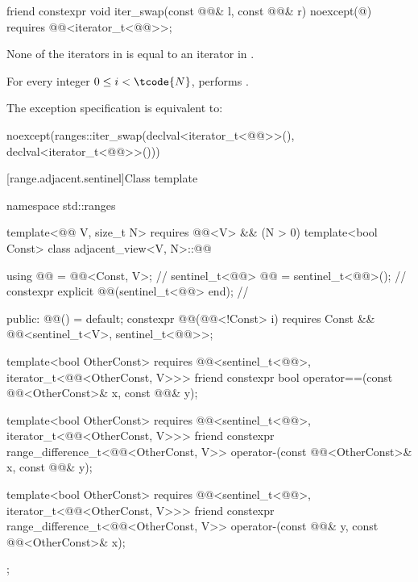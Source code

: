 %
\begin{itemdecl}
friend constexpr void iter_swap(const @@& l, const @@& r) noexcept(@\seebelow@)
  requires @@<iterator_t<@@>>;
\end{itemdecl}

\begin{itemdescr}
\pnum
\expects
None of the iterators in  is equal to
an iterator in .

\pnum
\effects
For every integer $0 \leq i < \tcode{N}$,
performs
.

\pnum
\remarks
The exception specification is equivalent to:
\begin{codeblock}
noexcept(ranges::iter_swap(declval<iterator_t<@@>>(), declval<iterator_t<@@>>()))
\end{codeblock}
\end{itemdescr}

[range.adjacent.sentinel]{Class template }

%
\begin{codeblock}
namespace std::ranges {
  template<@@ V, size_t N>
    requires @@<V> && (N > 0)
  template<bool Const>
  class adjacent_view<V, N>::@@ {
    using @@ = @@<Const, V>;                         // \expos
    sentinel_t<@@> @@ = sentinel_t<@@>();                 // \expos
    constexpr explicit @@(sentinel_t<@@> end);          // \expos

  public:
    @@() = default;
    constexpr @@(@@<!Const> i)
      requires Const && @@<sentinel_t<V>, sentinel_t<@@>>;

    template<bool OtherConst>
      requires @@<sentinel_t<@@>, iterator_t<@@<OtherConst, V>>>
    friend constexpr bool operator==(const @@<OtherConst>& x, const @@& y);

    template<bool OtherConst>
      requires @@<sentinel_t<@@>, iterator_t<@@<OtherConst, V>>>
    friend constexpr range_difference_t<@@<OtherConst, V>>
      operator-(const @@<OtherConst>& x, const @@& y);

    template<bool OtherConst>
      requires @@<sentinel_t<@@>, iterator_t<@@<OtherConst, V>>>
    friend constexpr range_difference_t<@@<OtherConst, V>>
      operator-(const @@& y, const @@<OtherConst>& x);
  };
}
\end{codeblock}

